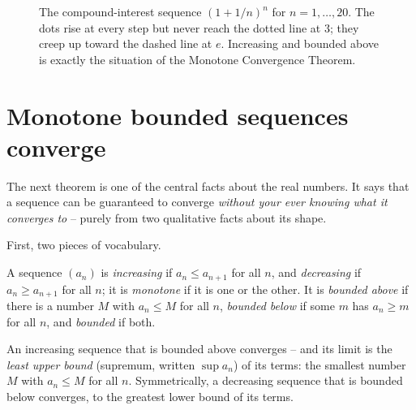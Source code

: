 \begin{figure}[htbp]
\centering
{}
\caption{The compound-interest sequence $(1+1/n)^n$ for $n = 1, \dots, 20$. The
dots rise at every step but never reach the dotted line at $3$; they creep up
toward the dashed line at $e$. Increasing and bounded above is exactly the
situation of the Monotone Convergence Theorem.}
\label{ch28:fig-compound}
\end{figure}

\section{Monotone bounded sequences converge}
\label{ch28:monotone}

The next theorem is one of the central facts about the real numbers. It says
that a sequence can be guaranteed to converge \emph{without your ever knowing
what it converges to} -- purely from two qualitative facts about its shape.

First, two pieces of vocabulary.

\begin{definition}
\label{ch28:def-monotone}
A sequence $(a_n)$ is \emph{increasing} if $a_n \le a_{n+1}$ for all $n$, and
\emph{decreasing} if $a_n \ge a_{n+1}$ for all $n$; it is \emph{monotone} if it
is one or the other. It is \emph{bounded above} if there is a number $M$ with
$a_n \le M$ for all $n$, \emph{bounded below} if some $m$ has $a_n \ge m$ for all
$n$, and \emph{bounded} if both.
\end{definition}

\begin{theorem}
\label{ch28:thm-mct}
An increasing sequence that is bounded above converges -- and its limit is the
\emph{least upper bound} (supremum, written $\sup a_n$) of its terms: the smallest
number $M$ with $a_n \le M$ for all $n$. Symmetrically, a decreasing
sequence that is bounded below converges, to the greatest lower bound of its
terms.
\end{theorem}

